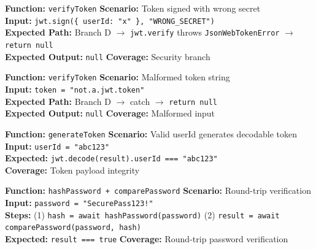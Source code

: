 \documentclass[12pt,a4paper]{report}
\newcommand{\pone}{\textbf{\color{p1red}P1}}
\begin{document}
\begin{tcolorbox}[criticalbox,title={AUTH-006 \hfill \pone\ --- Wrong Secret}]
\textbf{Function:} \texttt{verifyToken} \quad \textbf{Scenario:} Token signed with wrong secret \\
\textbf{Input:} \texttt{jwt.sign(\{ userId: "x" \}, "WRONG\_SECRET")} \\
\textbf{Expected Path:} Branch D $\to$ \texttt{jwt.verify} throws \texttt{JsonWebTokenError} $\to$ \texttt{return null} \\
\textbf{Expected Output:} \texttt{null} \quad \textbf{Coverage:} Security branch
\end{tcolorbox}

\begin{tcolorbox}[testbox,title={AUTH-007 \hfill \pone}]
\textbf{Function:} \texttt{verifyToken} \quad \textbf{Scenario:} Malformed token string \\
\textbf{Input:} \texttt{token = "not.a.jwt.token"} \\
\textbf{Expected Path:} Branch D $\to$ catch $\to$ \texttt{return null} \\
\textbf{Expected Output:} \texttt{null} \quad \textbf{Coverage:} Malformed input
\end{tcolorbox}

\begin{tcolorbox}[testbox,title={AUTH-008 \hfill \pone}]
\textbf{Function:} \texttt{generateToken} \quad \textbf{Scenario:} Valid userId generates decodable token \\
\textbf{Input:} \texttt{userId = "abc123"} \\
\textbf{Expected:} \texttt{jwt.decode(result).userId === "abc123"} \\
\textbf{Coverage:} Token payload integrity
\end{tcolorbox}

\begin{tcolorbox}[testbox,title={AUTH-009 \hfill \pone}]
\textbf{Function:} \texttt{hashPassword + comparePassword} \quad \textbf{Scenario:} Round-trip verification \\
\textbf{Input:} \texttt{password = "SecurePass123!"} \\
\textbf{Steps:} (1) \texttt{hash = await hashPassword(password)} \quad (2) \texttt{result = await comparePassword(password, hash)} \\
\textbf{Expected:} \texttt{result === true} \quad \textbf{Coverage:} Round-trip password verification
\end{tcolorbox}
\end{document}
